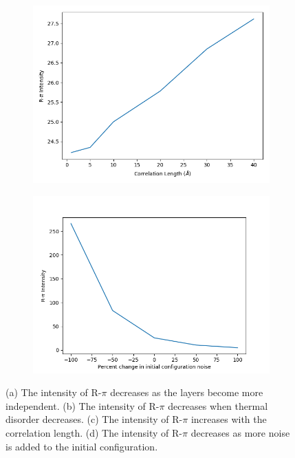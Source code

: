 \documentclass{article}
\begin{document}
\begin{figure}
\begin{subfigure}{0.45\textwidth}
  \includegraphics[width=\textwidth]{cl.png}
  \caption{}\label{fig:cl}
  \end{subfigure}
  \begin{subfigure}{0.45\textwidth} 
  \includegraphics[width=\textwidth]{IC.png}
  \caption{}\label{fig:IC}
  \end{subfigure}
  \caption{(a) The intensity of R-$\pi$ decreases as the layers become more
  independent. (b) The intensity of R-$\pi$ decreases when thermal disorder
  decreases. (c) The intensity of R-$\pi$ increases with the correlation length.
  (d) The intensity of R-$\pi$ decreases as more noise is added to the initial
  configuration.}\label{fig:sim_comp}
  \end{figure}
\end{document}
